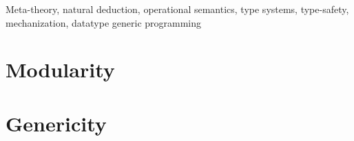 \documentclass[final,twoside,svgnames]{book}
\begin{document}
\newcommand{\name}{{\sc 3MT}~}
\newcommand{\Name}{{\sc 3MT}}
\renewcommand\cite[1]{\citep{#1}}

\frontmatter





\tableofcontents

\mainmatter






Meta-theory, natural deduction, operational semantics, type systems,
type-safety, mechanization, datatype generic programming
\part{Modularity}\label{part:mod}
{


}
\part{Genericity}\label{part:gen}
{


}
\end{document}
